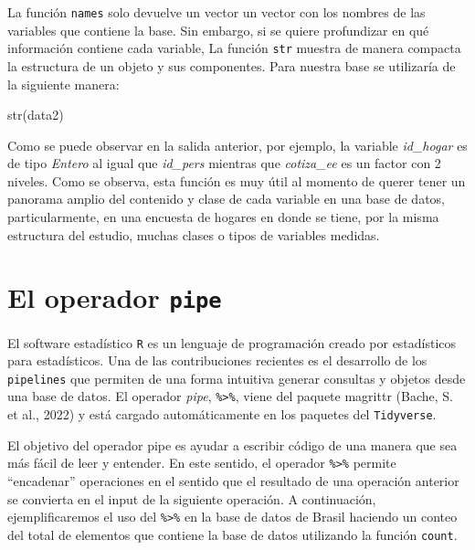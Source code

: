 \documentclass[
  12pt,
]{book}
\newenvironment{Shaded}{\begin{snugshade}}{\end{snugshade}}
\newcommand{\FunctionTok}[1]{\textcolor[rgb]{0.00,0.00,0.00}{#1}}
\newcommand{\NormalTok}[1]{#1}
\begin{document}
La función \texttt{names} solo devuelve un vector un vector con los nombres de las variables que contiene la base. Sin embargo, si se quiere profundizar en qué información contiene cada variable, La función \texttt{str} muestra de manera compacta la estructura de un objeto y sus componentes. Para nuestra base se utilizaría de la siguiente manera:

\begin{Shaded}
\begin{Highlighting}[]
\FunctionTok{str}\NormalTok{(data2)}
\end{Highlighting}
\end{Shaded}

Como se puede observar en la salida anterior, por ejemplo, la variable \emph{id\_hogar} es de tipo \emph{Entero} al igual que \emph{id\_pers} mientras que \emph{cotiza\_ee} es un factor con 2 niveles. Como se observa, esta función es muy útil al momento de querer tener un panorama amplio del contenido y clase de cada variable en una base de datos, particularmente, en una encuesta de hogares en donde se tiene, por la misma estructura del estudio, muchas clases o tipos de variables medidas.

\hypertarget{el-operador-pipe}{%
\section{\texorpdfstring{El operador \texttt{pipe}}{El operador pipe}}\label{el-operador-pipe}}

El software estadístico \texttt{R} es un lenguaje de programación creado por estadísticos para estadísticos. Una de las contribuciones recientes es el desarrollo de los \texttt{pipelines} que permiten de una forma intuitiva generar consultas y objetos desde una base de datos. El operador \emph{pipe}, \texttt{\%\textgreater{}\%}, viene del paquete magrittr (Bache, S. et al., 2022) y está cargado automáticamente en los paquetes del \texttt{Tidyverse}.

El objetivo del operador pipe es ayudar a escribir código de una manera que sea más fácil de leer y entender. En este sentido, el operador \texttt{\%\textgreater{}\%} permite ``encadenar'' operaciones en el sentido que el resultado de una operación anterior se convierta en el input de la siguiente operación. A continuación, ejemplificaremos el uso del \texttt{\%\textgreater{}\%} en la base de datos de Brasil haciendo un conteo del total de elementos que contiene la base de datos utilizando la función \texttt{count}.
\end{document}

